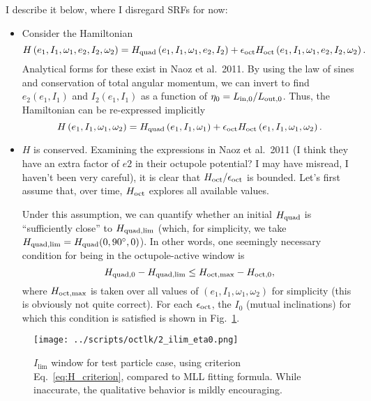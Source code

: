 \documentclass[11pt,
        usenames, %
        dvipsnames %
    ]{article}
\newcommand*{\p}[1]{\left(#1\right)}
\begin{document}
I describe it below, where I disregard SRFs for now:
\begin{itemize}
    \item Consider the Hamiltonian
        \begin{equation}
            H\p{e_1, I_1, \omega_1, e_2, I_2, \omega_2} = H_{\rm quad}\p{e_1,
            I_1, \omega_1, e_2, I_2} + \epsilon_{\rm oct} H_{\rm oct}\p{e_1,
            I_1, \omega_1, e_2, I_2, \omega_2}.
        \end{equation}
        Analytical forms for these exist in Naoz et al.\ 2011. By using the law
        of sines and conservation of total angular momentum, we can invert to
        find $e_2\p{e_1, I_1}$ and $I_2\p{e_1, I_1}$ as a function of $\eta_0 =
        L_{\rm in, 0} / L_{\rm out, 0}$. Thus, the Hamiltonian can be
        re-expressed implicitly
        \begin{equation}
            H\p{e_1, I_1, \omega_1, \omega_2} = H_{\rm quad}\p{e_1,
            I_1, \omega_1} + \epsilon_{\rm oct} H_{\rm oct}\p{e_1,
            I_1, \omega_1, \omega_2}.
        \end{equation}

    \item $H$ is conserved. Examining the expressions in Naoz et al.\ 2011 (I
        think they have an extra factor of $e2$ in their octupole potential? I
        may have misread, I haven't been very careful), it is clear that $H_{\rm
        oct} / \epsilon_{\rm oct}$ is bounded. Let's first assume that, over
        time, $H_{\rm oct}$ explores all available values.

        Under this assumption, we can quantify whether an initial $H_{\rm quad}$
        is ``sufficiently close'' to $H_{\rm quad, \lim}$ (which, for simplicity,
        we take $H_{\rm quad, \lim} = H_{\rm quad}(0, 90^\circ, 0)$). In other
        words, one seemingly necessary condition for being in the
        octupole-active window is
        \begin{equation}
            H_{\rm quad, 0} - H_{\rm quad, \lim} \leq H_{\rm oct, \max} - H_{\rm
                oct, 0},\label{eq:H_criterion}
        \end{equation}
        where $H_{\rm oct, \max}$ is taken over all values of $\p{e_1, I_1,
        \omega_1, \omega_2}$ for simplicity (this is obviously not quite
        correct). For each $\epsilon_{\rm oct}$, the $I_0$ (mutual inclinations)
        for which this condition is satisfied is shown in Fig.~\ref{fig:ilim}.
\end{itemize}
\begin{figure}
    \centering
    \texttt{[image: ../scripts/octlk/2\_ilim\_eta0.png]}
    \caption{$I_{\lim}$ window for test particle case, using criterion
    Eq.~\eqref{eq:H_criterion}, compared to MLL fitting formula. While
    inaccurate, the qualitative behavior is mildly encouraging.}\label{fig:ilim}
\end{figure}
\end{document}
